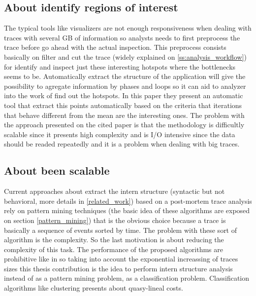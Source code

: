 \subsection{About identify regions of
interest}\label{ss:mot_regions_of_interest}

The typical tools like visualizers are not enough responsiveness when dealing
with traces with several GB of information so analysts needs to first
preprocess the trace before go ahead with the actual inspection. This preprocess
consists basically on filter and cut the trace (widely explained on
\ref{ss:analysis_workflow}) for identify and inspect just these interesting 
hotspots where the bottlenecks seems to be. Automatically extract the structure
of the application will give the possibility to agregate information by phases
and loops so it can aid to analyzer into the work of find out the
hotspots. In this paper \cite{trahay2015selecting} they present an automatic
tool that extract this points automatically based on the criteria that
iterations that behave different from the mean are the interesting ones. The
problem with the approach presented on the cited paper is that the methodology
is difficultly scalable since it presents high complexity and is I/O
intensive since the data should be readed repeatedly and it is a problem
when dealing with big traces. 

\subsection{About been scalable}

Current approaches about extract the intern structure (syntactic but not
behavioral, more details in \ref{related_work}) based on a post-mortem trace
analysis rely on pattern mining techniques (the basic idea of these algorithms 
are exposed on section \ref{pattern_mining}) that is the obvious choice because 
a trace is basically a sequence of events sorted by time. The problem with these 
sort of algorithm is the complexity. So the last motivation is about reducing the 
complexity of this task. The performance of the proposed algorithms are
prohibitive like in \cite{trahay2015selecting} \cite{Safyallah2006}
\cite{Lopez-Cueva2012} so taking into account the exponential increassing of 
traces sizes this thesis contribution is the idea to perform intern structure 
analysis instead of as a pattern mining problem, as a classification problem. 
Classification algorithms like clustering presents about quasy-lineal costs.



